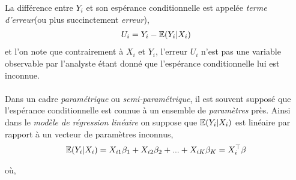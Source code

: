 La différence entre $Y_i$ et son espérance conditionnelle est appelée \emph{terme d'erreur}(ou plus succinctement \emph{erreur}),
\begin{align}
U_i = Y_i - \mathbb{E}(Y_i| X_i)
\label{eq1}
\end{align} 
 et l'on note que contrairement à $X_i$ et $Y_i$, l'erreur $U_i$ n'est pas une variable observable par l'analyste étant donné que l'espérance conditionnelle lui est inconnue.\\\\
Dans un cadre \emph{paramétrique} ou \emph{semi-paramétrique}, il est souvent supposé que l'espérance conditionnelle est connue à un ensemble de \emph{paramètres} près. Ainsi dans le \emph{modèle de régression linéaire} on suppose que $\mathbb{E}(Y_i|X_i)$ est linéaire par rapport à un vecteur de paramètres inconnus,
\begin{align}
\mathbb{E}(Y_i|X_i) = X_{i1}\beta_1 +  X_{i2}\beta_2 + ...+ X_{iK}\beta_K = X_i^\top\beta
\label{eq2}
\end{align}

où,

